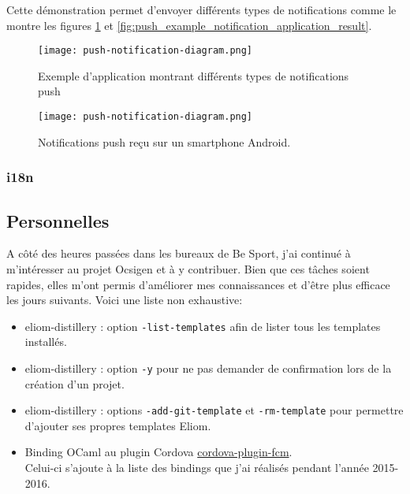 Cette démonstration permet d'envoyer différents types de notifications comme le
montre les figures \ref{fig:push_notification_example_application_web} et \ref{fig:push_example_notification_application_result}.

\begin{figure}
  \centering
  \texttt{[image: push-notification-diagram.png]}
  \caption{Exemple d'application montrant différents types de notifications push}
  \label{fig:push_notification_example_application_web}
\end{figure}

\begin{figure}
  \centering
  \texttt{[image: push-notification-diagram.png]}
  \caption{Notifications push reçu sur un smartphone Android.}
  \label{fig:push_notification_example_application_result}
\end{figure}

\subsubsection*{i18n}

\subsection{Personnelles}

A côté des heures passées dans les bureaux de Be Sport, j'ai continué à
m'intéresser au projet Ocsigen et à y contribuer. Bien que ces tâches soient
rapides, elles m'ont permis d'améliorer mes connaissances et d'être plus efficace
les jours suivants. Voici une liste non exhaustive:
\begin{itemize}
  \item eliom-distillery : option \verb|-list-templates| afin de lister tous les templates installés.
  \item eliom-distillery : option \verb|-y| pour ne pas demander de confirmation lors
    de la création d'un projet.
  \item eliom-distillery : options \verb|-add-git-template| et
\verb|-rm-template| pour permettre d'ajouter ses propres templates Eliom.\cite{eliom-distillery-repo}
  \item Binding OCaml au plugin Cordova
    \href{https://github.com/fechanique/cordova-plugin-fcm}{cordova-plugin-fcm}.\cite{ocaml-cordova-plugin-fcm} \\
    Celui-ci s'ajoute à la liste des bindings que j'ai réalisés pendant
l'année 2015-2016.\cite{ocaml-cordova-plugin-list}
\end{itemize}
